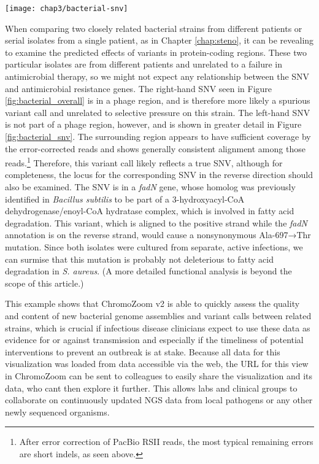 \begin{figure*}
  \texttt{[image: chap3/bacterial-snv]}               
  \caption[A SNV between the two \emph{S. aureus} strains is in \emph{fadN}]{A SNV between the two \emph{S. aureus} strains is in \emph{fadN}, which putatively encodes a 3-hydroxyacyl-CoA dehydrogenase. Note that \emph{fadN} is on the negative strand while the SNV annotation (top track) is relative to the positive strand.}
  \label{fig:bacterial_snv}
\end{figure*}

When comparing two closely related bacterial strains from different patients or serial isolates from a single patient, as in Chapter \ref{chap:steno}, it can be revealing to examine the predicted effects of variants in protein-coding regions. These two particular isolates are from different patients and unrelated to a failure in antimicrobial therapy, so we might not expect any relationship between the SNV and antimicrobial resistance genes. The right-hand SNV seen in Figure \ref{fig:bacterial_overall} is in a phage region, and is therefore more likely a spurious variant call and unrelated to selective pressure on this strain. The left-hand SNV is not part of a phage region, however, and is shown in greater detail in Figure \ref{fig:bacterial_snv}. The surrounding region appears to have sufficient coverage by the error-corrected reads and shows generally consistent alignment among those reads.\footnote{After error correction of PacBio RSII reads, the most typical remaining errors are short indels, as seen above.} Therefore, this variant call likely reflects a true SNV, although for completeness, the locus for the corresponding SNV in the reverse direction should also be examined. The SNV is in a \emph{fadN} gene, whose homolog was previously identified in \emph{Bacillus subtilis} to be part of a 3-hydroxyacyl-CoA dehydrogenase/enoyl-CoA hydratase complex, which is involved in fatty acid degradation.\autocite{Matsuoka2007} This variant, which is aligned to the positive strand while the \emph{fadN} annotation is on the reverse strand, would cause a nonsynonymous Ala-697→Thr mutation. Since both isolates were cultured from separate, active infections, we can surmise that this mutation is probably not deleterious to fatty acid degradation in \emph{S. aureus}. (A more detailed functional analysis is beyond the scope of this article.)

This example shows that ChromoZoom v2 is able to quickly assess the quality and content of new bacterial genome assemblies and variant calls between related strains, which is crucial if infectious disease clinicians expect to use these data as evidence for or against transmission and especially if the timeliness of potential interventions to prevent an outbreak is at stake. Because all data for this visualization was loaded from data accessible via the web, the URL for this view in ChromoZoom can be sent to colleagues to easily share the visualization and its data, who cant then explore it further. This allows labs and clinical groups to collaborate on continuously updated NGS data from local pathogens or any other newly sequenced organisms.


